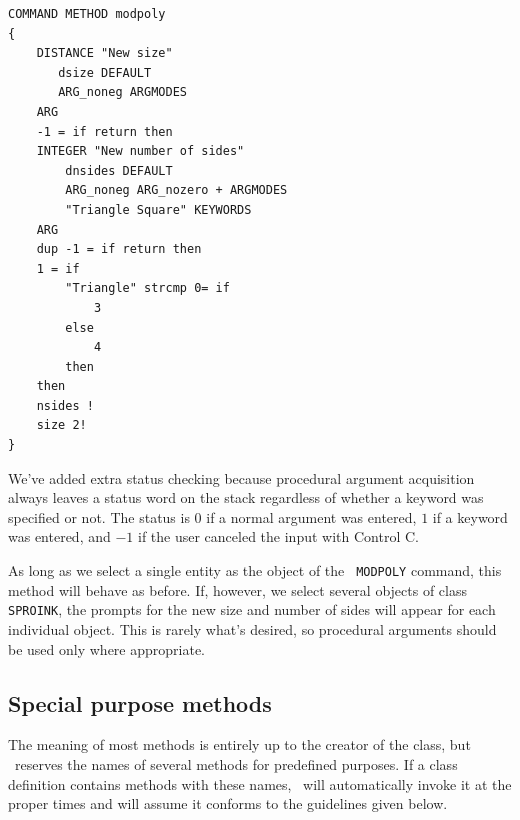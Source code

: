 \documentclass{article}
\begin{document}
\begin{verbatim}
COMMAND METHOD modpoly
{
    DISTANCE "New size"
       dsize DEFAULT
       ARG_noneg ARGMODES
    ARG
    -1 = if return then
    INTEGER "New number of sides"
        dnsides DEFAULT
        ARG_noneg ARG_nozero + ARGMODES
        "Triangle Square" KEYWORDS
    ARG
    dup -1 = if return then
    1 = if
        "Triangle" strcmp 0= if
            3
        else
            4
        then
    then
    nsides !
    size 2!
}
\end{verbatim}

We've added extra status checking because procedural argument
acquisition always leaves a status word on the stack regardless of
whether a keyword was specified or not.  The status is 0 if a normal
argument was entered, $1$ if a keyword was entered, and $-1$ if the
user canceled the input with Control C\@.

As long as we select a single entity as the object of the {\tt
MODPOLY} command, this method will behave as before.  If, however, we select
several objects of class {\tt SPROINK}, the prompts for the new size
and number of sides will appear for each individual object.  This is
rarely what's desired, so procedural arguments should be used only
where appropriate.

\subsection{Special purpose methods}

The meaning of most methods is entirely up to the creator of the
class, but \cw\ reserves the names of several methods for predefined
purposes.  If a class definition contains methods with these names,
\cw\ will automatically invoke it at the
proper times and will assume it conforms to the guidelines given
below.
\end{document}
